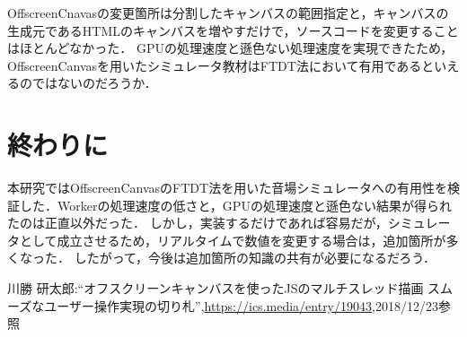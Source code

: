\documentclass[twocolumn,10pt,a4j]{jsarticle}
\begin{document}
OffscreenCnavasの変更箇所は分割したキャンバスの範囲指定と，キャンバスの生成元であるHTMLのキャンバスを増やすだけで，ソースコードを変更することはほとんどなかった．
GPUの処理速度と遜色ない処理速度を実現できたため，OffscreenCanvasを用いたシミュレータ教材はFTDT法において有用であるといえるのではないのだろうか．

\section{終わりに}
本研究ではOffscreenCanvasのFTDT法を用いた音場シミュレータへの有用性を検証した．Workerの処理速度の低さと，GPUの処理速度と遜色ない結果が得られたのは正直以外だった．
しかし，実装するだけであれば容易だが，シミュレータとして成立させるため，リアルタイムで数値を変更する場合は，追加箇所が多くなった．
したがって，今後は追加箇所の知識の共有が必要になるだろう．

\begin{thebibliography}{99}

	川勝 研太郎:``オフスクリーンキャンバスを使ったJSのマルチスレッド描画  スムーズなユーザー操作実現の切り札'',\url{https://ics.media/entry/19043},2018/12/23参照

\end{thebibliography}
\end{document}
